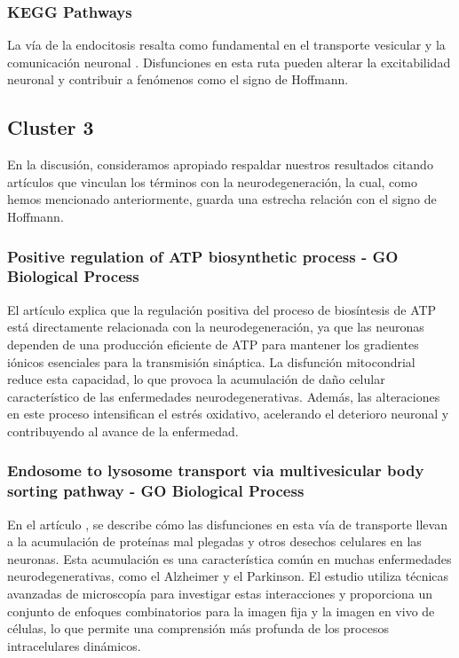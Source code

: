\subsubsection{KEGG Pathways}

La vía de la endocitosis resalta como fundamental en el transporte vesicular y la comunicación neuronal \cite{Chanaday8209}. Disfunciones en esta ruta pueden alterar la excitabilidad neuronal y contribuir a fenómenos como el signo de Hoffmann.




\subsection{Cluster 3}

En la discusión, consideramos apropiado respaldar nuestros resultados citando artículos que vinculan los términos con la neurodegeneración, la cual, como hemos mencionado anteriormente, guarda una estrecha relación con el signo de Hoffmann.

\subsubsection{Positive regulation of ATP biosynthetic process - GO Biological Process}
El artículo \cite{Bonvento2017} explica que la regulación positiva del proceso de biosíntesis de ATP está directamente relacionada con la neurodegeneración, ya que las neuronas dependen de una producción eficiente de ATP para mantener los gradientes iónicos esenciales para la transmisión sináptica. La disfunción mitocondrial reduce esta capacidad, lo que provoca la acumulación de daño celular característico de las enfermedades neurodegenerativas. Además, las alteraciones en este proceso intensifican el estrés oxidativo, acelerando el deterioro neuronal y contribuyendo al avance de la enfermedad. 

\subsubsection{Endosome to lysosome transport via multivesicular body sorting pathway - GO Biological Process}
En el artículo \cite{Mulligan2023}, se describe cómo las disfunciones en esta vía de transporte llevan a la acumulación de proteínas mal plegadas y otros desechos celulares en las neuronas. Esta acumulación es una característica común en muchas enfermedades neurodegenerativas, como el Alzheimer y el Parkinson. El estudio utiliza técnicas avanzadas de microscopía para investigar estas interacciones y proporciona un conjunto de enfoques combinatorios para la imagen fija y la imagen en vivo de células, lo que permite una comprensión más profunda de los procesos intracelulares dinámicos.


